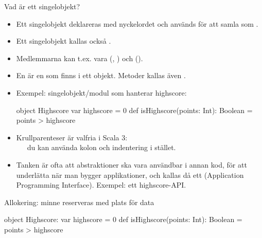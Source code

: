 \begin{Slide}{Vad är ett singelobjekt?}
\begin{itemize}\SlideFontSmall
\item Ett singelobjekt  deklareras med nyckelordet  och används för att samla   som .
\item Ett singelobjekt kallas också  .
\item Medlemmarna kan t.ex. vara  (, ) och  (). 
\item En  är en  som finns i ett objekt. Metoder kallas även .
\item Exempel: singelobjekt/modul som hanterar highscore:
\begin{Code}
object Highscore {
  var highscore = 0
  def isHighscore(points: Int): Boolean = points > highscore
}
\end{Code}
\item Krullparenteser är valfria i Scala 3:\\~~~du kan använda kolon och indentering i stället.
\pause
\item Tanken är ofta att abstraktioner ska vara användbar i annan kod, för att underlätta när man bygger applikationer, och kallas då ett  (Application Programming Interface). Exempel: ett highscore-API.
\end{itemize}
\end{Slide}


\begin{Slide}{Allokering: minne reserveras med plats för data}
\begin{Code}
object Highscore:
  var highscore = 0
  def isHighscore(points: Int): Boolean = points > highscore

\end{Code}
\pause
{}
\end{Slide}


